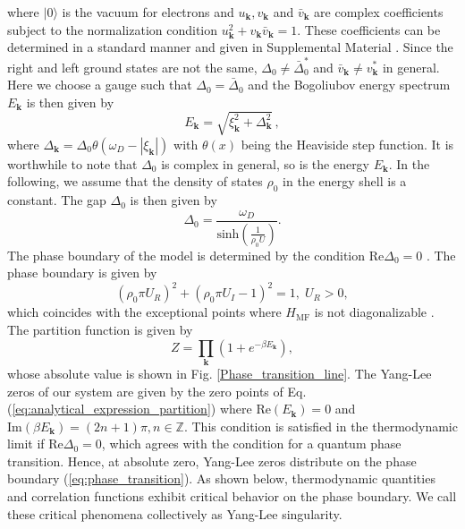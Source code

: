 \documentclass[aps,prl,twocolumn,nofootinbib,superscriptaddress,notitlepage,longbibliography]{revtex4-1}
\begin{document}
	where $|0\rangle$ is the vacuum for electrons and $u_{\bm{k}},v_{\bm{k}}$ and $\bar{v}_{\bm{k}}$ are complex coefficients subject to the normalization condition $u_{\bm{k}}^2+v_{\bm{k}}\bar{v}_{\bm{k}}=1$. These coefficients can be determined in a standard manner and given in Supplemental Material \cite{SupplementaryMaterial}. Since the right and left ground states are not the same, $\Delta_0\neq \bar{\Delta}_{0}^*$ and $\bar{v}_{\bm{k}}\neq v_{\bm{k}}^*$ in general. Here we choose a gauge such that $\Delta_0=\bar{\Delta}_0$ and the Bogoliubov energy spectrum $E_{\bm{k}}$ is then given by \cite{Yamamoto2019}
	\begin{equation}
		E_{\bm{k}}=\sqrt{\xi_{\bm{k}}^2+\Delta_{\bm{k}}^2}\,,
	\end{equation} 
where $\Delta_{\bm{k}}=\Delta_0\theta(\omega_D-|\xi_{\bm{k}}|)$ with $\theta(x)$ being the Heaviside step function. It is worthwhile to note that $\Delta_0$ is complex in general, so is the energy $E_{\bm{k}}$. In the following, we assume that the density of states $\rho_{0}$ in the energy shell is a constant. The gap $\Delta_0$ is then given by 
	\begin{equation}
		\Delta_0 =
		\frac{\omega_D}{\text{sinh} \left( \frac{1}{\rho_0 U}\right)}.\label{eq:gap}
	\end{equation}
	The phase boundary of the model is determined by the condition $\text{Re}\Delta_0=0$ \cite{Yamamoto2019}. The phase boundary is given by
	\begin{equation}
	(\rho_{0}\pi U_{R})^{2}+(\rho_{0}\pi U_I-1)^{2}=1,\;U_{R}>0,\label{eq:phase_transition}
	\end{equation}
	 which coincides with the exceptional points where $H_{\mathrm{MF}}$ is not diagonalizable \cite{Yamamoto2019}. The partition function is given by
	\begin{equation}
	Z=\prod_{\bm{k}}(1+e^{-\beta E_{\bm{k}}}),\label{eq:analytical_expression_partition}
	\end{equation}
	whose absolute value is shown in Fig. \ref{Phase_transition_line}. 
	The Yang-Lee
	zeros of our system are given by the zero points of Eq. (\ref{eq:analytical_expression_partition}) %
	where $\mathrm{Re}(E_{\bm{k}})=0$
	and $\mathrm{Im}(\beta E_{\bm{k}})=(2n+1)\pi,n\in\mathbb{Z}$. This condition is satisfied in the thermodynamic limit if $\mathrm{Re}\Delta_0=0$, which agrees with the condition for a quantum phase transition. Hence, at absolute zero, Yang-Lee zeros distribute on the phase boundary (\ref{eq:phase_transition}). As shown below, thermodynamic quantities and correlation functions exhibit critical behavior on the phase boundary. We call these critical phenomena collectively as Yang-Lee singularity. 
	
\end{document}
